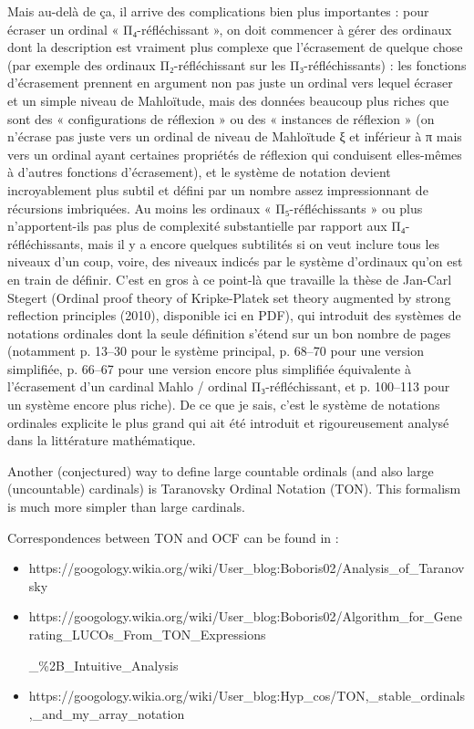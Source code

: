 \documentclass[10pt]{article}
\begin{document}
\begin{changemargin}{1cm}{1cm}
	Mais au-delà de ça, il arrive des complications bien plus importantes : pour écraser un ordinal « Π₄-réfléchissant », on doit commencer à gérer des ordinaux dont la description est vraiment plus complexe que l'écrasement de quelque chose (par exemple des ordinaux Π₂-réfléchissant sur les Π₃-réfléchissants) : les fonctions d'écrasement prennent en argument non pas juste un ordinal vers lequel écraser et un simple niveau de Mahloïtude, mais des données beaucoup plus riches que sont des « configurations de réflexion » ou des « instances de réflexion » (on n'écrase pas juste vers un ordinal de niveau de Mahloïtude ξ et inférieur à π mais vers un ordinal ayant certaines propriétés de réflexion qui conduisent elles-mêmes à d'autres fonctions d'écrasement), et le système de notation devient incroyablement plus subtil et défini par un nombre assez impressionnant de récursions imbriquées. Au moins les ordinaux « Π₅-réfléchissants » ou plus n'apportent-ils pas plus de complexité substantielle par rapport aux Π₄-réfléchissants, mais il y a encore quelques subtilités si on veut inclure tous les niveaux d'un coup, voire, des niveaux indicés par le système d'ordinaux qu'on est en train de définir. C'est en gros à ce point-là que travaille la thèse de Jan-Carl Stegert (Ordinal proof theory of Kripke-Platek set theory augmented by strong reflection principles (2010), disponible ici en PDF), qui introduit des systèmes de notations ordinales dont la seule définition s'étend sur un bon nombre de pages (notamment p. 13–30 pour le système principal, p. 68–70 pour une version simplifiée, p. 66–67 pour une version encore plus simplifiée équivalente à l'écrasement d'un cardinal Mahlo / ordinal Π₃-réfléchissant, et p. 100–113 pour un système encore plus riche). De ce que je sais, c'est le système de notations ordinales explicite le plus grand qui ait été introduit et rigoureusement analysé dans la littérature mathématique.
	
\end{changemargin}
\bigskip
 
 Another (conjectured) way to define large countable ordinals (and also large (uncountable) cardinals) is Taranovsky Ordinal Notation (TON). This formalism is much more simpler than large cardinals. 
 
 Correspondences between TON and OCF can be found in :
 
 \begin{itemize}
  \item https://googology.wikia.org/wiki/User\_blog:Boboris02/Analysis\_of\_Taranovsky%
  \item https://googology.wikia.org/wiki/User\_blog:Boboris02/Algorithm\_for\_Generating\_LUCOs\_From\_TON\_Expressions
  
  \_\%2B\_Intuitive\_Analysis
  \item https://googology.wikia.org/wiki/User\_blog:Hyp\_cos/TON,\_stable\_ordinals,\_and\_my\_array\_notation
\end{itemize}
\end{document}
